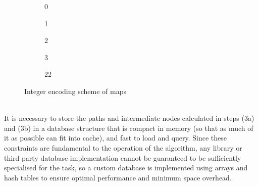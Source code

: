 \documentclass[12pt,notitlepage]{report}
\begin{document}
\begin{figure}[h]
    \centering
    \begin{subfigure}{.18\textwidth}
    \centering
    \caption{0}
    \end{subfigure}
    \begin{subfigure}{.18\textwidth}
    \centering
    \caption{1}
    \end{subfigure}
     \begin{subfigure}{.18\textwidth}
     \centering
    \caption{2}
    \end{subfigure}
    \begin{subfigure}{.18\textwidth}
    \centering
    \caption{3}
    \end{subfigure}
    \begin{subfigure}{.18\textwidth}
    \centering
    \caption{22}
    \end{subfigure}
  \caption{Integer encoding scheme of maps}
\end{figure}

\\
\noindent
It is necessary to store the paths and intermediate nodes calculated in steps (3a) and (3b) in a database structure that is compact in memory (so that as much of it as possible can fit into cache), and fast to load and query. Since these constraints are fundamental to the operation of the algorithm, any library or third party database implementation cannot be guaranteed to be sufficiently specialised for the task, so a custom database is implemented using arrays and hash tables to ensure optimal performance and minimum space overhead.\\
\end{document}
